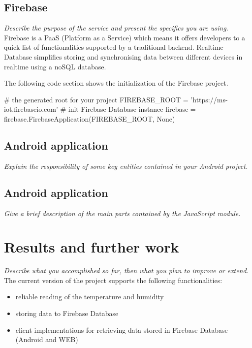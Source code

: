 \documentclass[a4paper,11pt]{article}
\begin{document}
\subsection{Firebase}
\textit{Describe the purpose of the service and present the specifics you are using.}\\

Firebase is a PaaS (Platform as a Service) which means it offers developers to a quick list of functionalities supported by a traditional backend.
Realtime Database simplifies storing and synchronising data between different devices in realtime using a noSQL database.

The following code section shows the initialization of the Firebase project.

\newpage
\begin{python}
# the generated root for your project
FIREBASE_ROOT = 'https://ms-iot.firebaseio.com'
# init Firebase Database instance
firebase = firebase.FirebaseApplication(FIREBASE_ROOT, None)
\end{python}

\subsection{Android application}
\textit{Explain the responsibility of some key entities contained in your Android project.}

\subsection{Android application}
\textit{Give a brief description of the main parts contained by the JavaScript module.}

\section{Results and further work}
\textit{Describe what you accomplished so far, then what you plan to improve or extend.}\\

The current version of the project supports the following functionalities:
\begin{itemize}  
\item reliable reading of the temperature and humidity
\item storing data to Firebase Database
\item client implementations for retrieving data stored in Firebase Database (Android and WEB)\\
\end{itemize}
\end{document}

